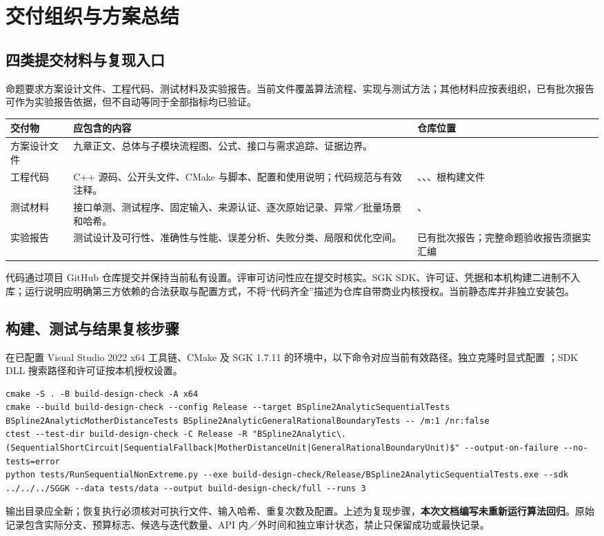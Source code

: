 \documentclass[UTF8,zihao=5,fontset=windows,a4paper]{ctexart}
\newcommand{\code}[1]{\texttt{\detokenize{#1}}}
\begin{document}
\newpage
\section{交付组织与方案总结}
\subsection{四类提交材料与复现入口}
命题要求方案设计文件、工程代码、测试材料及实验报告。当前文件覆盖算法流程、实现与测试方法；其他材料应按表组织，已有批次报告可作为实验报告依据，但不自动等同于全部指标均已验证。
\begin{center}\small\renewcommand{\arraystretch}{1.2}
\begin{tabularx}{\linewidth}{@{}p{24mm}Yp{38mm}@{}}\toprule
交付物 & 应包含的内容 & 仓库位置\\\midrule
方案设计文件 & 九章正文、总体与子模块流程图、公式、接口与需求追踪、证据边界。 & \\
工程代码 & C++ 源码、公开头文件、CMake 与脚本、配置和使用说明；代码规范与有效注释。 & 、、、根构建文件\\
测试材料 & 接口单测、测试程序、固定输入、来源认证、逐次原始记录、异常／批量场景和哈希。 & 、\\
实验报告 & 测试设计及可行性、准确性与性能、误差分析、失败分类、局限和优化空间。 & 已有批次报告；完整命题验收报告须据实汇编\\\bottomrule
\end{tabularx}
\end{center}
代码通过项目 GitHub 仓库提交并保持当前私有设置。评审可访问性应在提交时核实。SGK SDK、许可证、凭据和本机构建二进制不入库；运行说明应明确第三方依赖的合法获取与配置方式，不将“代码齐全”描述为仓库自带商业内核授权。当前静态库并非独立安装包。

\subsection{构建、测试与结果复核步骤}
在已配置 Visual Studio 2022 x64 工具链、CMake 及 SGK 1.7.11 的环境中，以下命令对应当前有效路径。独立克隆时显式配置 \code{SGGK_SDK_DIR}；SDK DLL 搜索路径和许可证按本机授权设置。
\begin{lstlisting}
cmake -S . -B build-design-check -A x64
cmake --build build-design-check --config Release --target BSpline2AnalyticSequentialTests BSpline2AnalyticMotherDistanceTests BSpline2AnalyticGeneralRationalBoundaryTests -- /m:1 /nr:false
ctest --test-dir build-design-check -C Release -R "BSpline2Analytic\.(SequentialShortCircuit|SequentialFallback|MotherDistanceUnit|GeneralRationalBoundaryUnit)$" --output-on-failure --no-tests=error
python tests/RunSequentialNonExtreme.py --exe build-design-check/Release/BSpline2AnalyticSequentialTests.exe --sdk ../../../SGGK --data tests/data --output build-design-check/full --runs 3
\end{lstlisting}
输出目录应全新；恢复执行必须核对可执行文件、输入哈希、重复次数及配置。上述为复现步骤，\textbf{本次文档编写未重新运行算法回归}。原始记录包含实际分支、预算标志、候选与迭代数量、API 内／外时间和独立审计状态，禁止只保留成功或最快记录。
\end{document}
